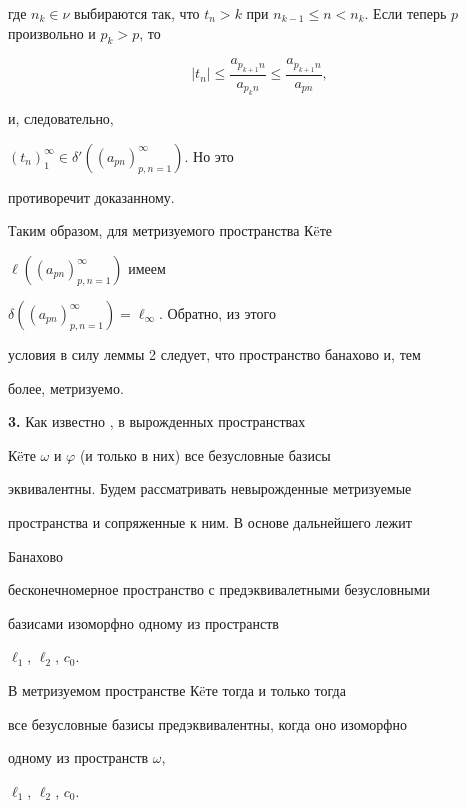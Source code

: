 где $n_k\in\nu$ выбираются так, что $t_n>k$ при $n_{k-1}\leqslant


n<n_k$. Если теперь $p$ произвольно и $p_k>p$, то


$$


|t_n|\leqslant \frac{a_{p_{k+1}n}}{a_{p_kn}}\leqslant


\frac{a_{p_{k+1}n}}{a_{pn}},


$$


и, следовательно,


$(t_n)^\infty_1\in\delta'((a_{pn})^\infty_{p,n=1})$. Но это


противоречит доказанному.





Таким образом, для метризуемого пространства К\"eте


$\ell((a_{pn})^\infty_{p,n=1})$ имеем


$\delta((a_{pn})^\infty_{p,n=1})=\ell_\infty$. Обратно, из этого


условия в силу леммы 2 следует, что пространство банахово и, тем


более, метризуемо.


\medskip





{\bf 3.} Как известно \cite{5Dr80}, в вырожденных пространствах


К\"eте $\omega$ и $\varphi$ (и только в них) все безусловные базисы


эквивалентны. Будем рассматривать невырожденные метризуемые


пространства и сопряженные к ним. В основе дальнейшего лежит





\begin{lem}


Банахово


бесконечномерное пространство с предэквивалетными безусловными


базисами изоморфно одному из пространств


$\ell_1$, $\ell_2$, $c_0$.


\end{lem}





\begin{thm}


В метризуемом пространстве К\"eте тогда и только тогда


все безусловные базисы предэквивалентны, когда оно изоморфно


одному из пространств $\omega$,


$\ell_1$, $\ell_2$, $c_0$.


\end{thm}





